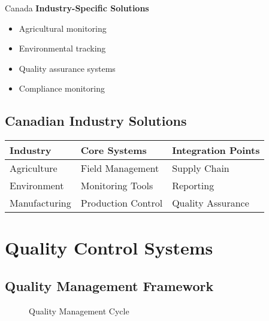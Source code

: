 \begin{regionalbox}{Canada}
\textbf{Industry-Specific Solutions}
\begin{itemize}
    \item Agricultural monitoring
    \item Environmental tracking
    \item Quality assurance systems
    \item Compliance monitoring
\end{itemize}

\subsection{Canadian Industry Solutions}
\begin{center}
\begin{tabularx}{\textwidth}{>{\raggedright\arraybackslash}X >{\raggedright\arraybackslash}X >{\raggedright\arraybackslash}X}
    \toprule
    \textbf{Industry} & \textbf{Core Systems} & \textbf{Integration Points} \\
    \midrule
    Agriculture & Field Management & Supply Chain \\
    Environment & Monitoring Tools & Reporting \\
    Manufacturing & Production Control & Quality Assurance \\
    \bottomrule
\end{tabularx}
\end{center}
\end{regionalbox}

\FloatBarrier
\section{Quality Control Systems}

\subsection{Quality Management Framework}
\begin{figure}[htbp]
    \centering
    \caption{Quality Management Cycle}
    \label{fig:quality-cycle}
\end{figure}

